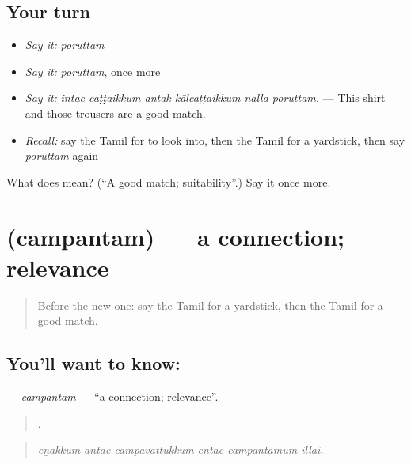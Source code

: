 \subsection*{Your turn}
\begin{itemize}
\raggedright
  \item \emph{Say it:} \emph{poruttam}
  \item \emph{Say it:} \emph{poruttam}, once more
  \item \emph{Say it:} \emph{intac caṭṭaikkum antak kālcaṭṭaikkum nalla poruttam.} — This shirt and those trousers are a good match.
  \item \emph{Recall:} say the Tamil for to look into, then the Tamil for a yardstick, then say \emph{poruttam} again
\end{itemize}

\begin{tcolorbox}[breakable,colback=teal!4,colframe=teal!35!black,title={Before you move on}]
What does  mean? (\textquotedblleft{}A good match; suitability\textquotedblright{}.) Say it once more.
\end{tcolorbox}
\section[\texorpdfstring{\ta{சம்பந்தம்} (campantam)}{சம்பந்தம் (campantam)}]{ (campantam) — a connection; relevance}

\label{lesson:TA-C361-campantam}



\begin{quote}
Before the new one: say the Tamil for a yardstick, then the Tamil for a good match.
\end{quote}

\subsection*{You'll want to know: }
\textbf{} — \emph{campantam} — \textquotedblleft{}a connection; relevance\textquotedblright{}.

\begin{quote}
     .
\end{quote}

\begin{quote}
\emph{eṉakkum antac campavattukkum entac campantamum illai.}
\end{quote}

